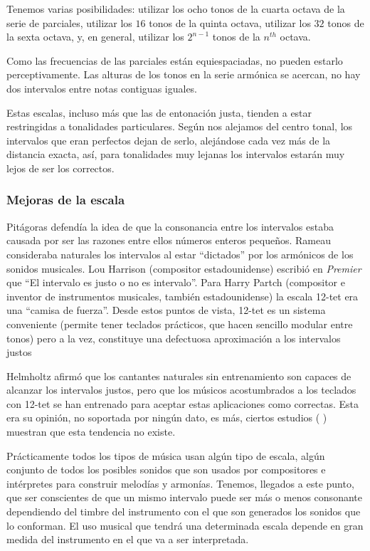 \documentclass[11pt,a4paper]{article}
\begin{document}
	Tenemos varias posibilidades: utilizar los ocho tonos de la cuarta octava de la serie de parciales, utilizar los $16$ tonos de la quinta octava, utilizar los $32$ tonos de la sexta octava, y, en general, utilizar los $2^{n-1}$ tonos de la $n^{th}$ octava.
	
	Como las frecuencias de las  parciales están equiespaciadas, no pueden estarlo perceptivamente. Las alturas de los tonos en la serie armónica se acercan, no hay dos intervalos entre notas contiguas iguales. 
	
	Estas escalas, incluso más que las de entonación justa, tienden a estar restringidas a tonalidades particulares. Según nos alejamos del centro tonal, los intervalos que eran perfectos dejan de serlo, alejándose cada vez más de la distancia exacta, así, para tonalidades muy lejanas los intervalos estarán muy lejos de ser los correctos. 
	
	\subsubsection{Mejoras de la escala}
	
	Pitágoras defendía la idea de que la consonancia entre los intervalos estaba causada por ser las razones entre ellos  números enteros pequeños. Rameau consideraba naturales los intervalos al estar ``dictados'' por los armónicos de los sonidos musicales. Lou Harrison (compositor estadounidense) escribió en \textit{Premier} \cite{LS} que ``El intervalo es justo o no es intervalo''. Para Harry Partch (compositor e inventor de instrumentos musicales, también estadounidense) la escala 12-tet era una ``camisa de fuerza''. Desde estos puntos de vista, 12-tet es un sistema conveniente (permite tener teclados prácticos, que hacen sencillo modular entre tonos) pero a la vez, constituye una defectuosa aproximación a los intervalos justos
	
	Helmholtz afirmó que los cantantes naturales sin entrenamiento son capaces de alcanzar los intervalos justos, pero que los músicos acostumbrados a los teclados con 12-tet se han entrenado para aceptar estas aplicaciones como correctas. Esta era su opinión, no soportada por ningún dato, es más, ciertos estudios (\cite{CA} \cite{BW}) muestran que esta tendencia no existe.
	
	Prácticamente todos los tipos de música usan algún tipo de escala, algún conjunto de todos los posibles sonidos que son usados por compositores e intérpretes para construir melodías y armonías. Tenemos, llegados a este punto, que ser conscientes de que un mismo intervalo puede ser más o menos consonante dependiendo del timbre del instrumento con el que son generados los sonidos que lo conforman. El uso musical que tendrá una determinada escala depende en gran medida del instrumento en el que va a ser interpretada.
	
\end{document}
